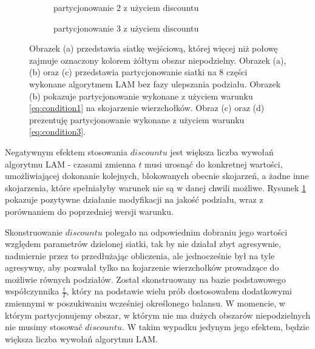 \begin{figure}[h]
\begin{subfigure}{.5\textwidth}
    \caption[short]{partycjonowanie 2 z użyciem discountu}
\end{subfigure}%
\begin{subfigure}{.5\textwidth}
    \centering
    \caption[short]{partycjonowanie 3 z użyciem discountu}
\end{subfigure}
\caption{Obrazek (a) przedstawia siatkę wejściową, której więcej niż połowę zajmuje oznaczony kolorem żółtym obszar niepodzielny.
Obrazek (a), (b) oraz (c) przedstawia partycjonowanie siatki na 8 części wykonane algorytmem LAM bez fazy ulepszania podziału.
Obrazek (b) pokazuje partycjonowanie wykonane z użyciem warunku \ref{eq:condition1} na skojarzenie wierzchołków.
Obraz (c) oraz (d) prezentuję partycjonowanie wykonane z użyciem warunku \ref{eq:condition3}.}
\label{im:discount}
\end{figure}

\newpage
Negatywnym efektem stosowania $discountu$ jest większa liczba wywołań algorytmu LAM
- czasami zmienna $t$ musi urosnąć
do konkretnej wartości, umożliwiającej dokonanie kolejnych, blokowanych obecnie skojarzeń, a żadne inne skojarzenia,
które spełniałyby warunek nie są w danej chwili możliwe.
Rysunek \ref{im:discount} pokazuje pozytywne działanie modyfikacji na jakość podziału, wraz z porównaniem do poprzedniej
wersji warunku.

Skonstruowanie $discountu$ polegało na odpowiednim dobraniu jego wartości względem parametrów dzielonej siatki, tak by
nie działał zbyt agresywnie, nadmiernie przez to przedłużając obliczenia, ale jednocześnie był na tyle agresywny, aby pozwalał tylko na
kojarzenie wierzchołków prowadzące do możliwie równych podziałów.
Został skonstruowany na bazie podstawowego współczynnika $\frac{t}{T}$, który na podstawie wielu prób
dostosowałem dodatkowymi zmiennymi w poszukiwaniu wcześniej określonego balansu.
W momencie, w którym partycjonujemy obszar, w którym nie ma dużych obszarów niepodzielnych nie musimy stosować
$discountu$.
W takim wypadku jedynym jego efektem, będzie większa liczba wywołań algorytmu LAM.


